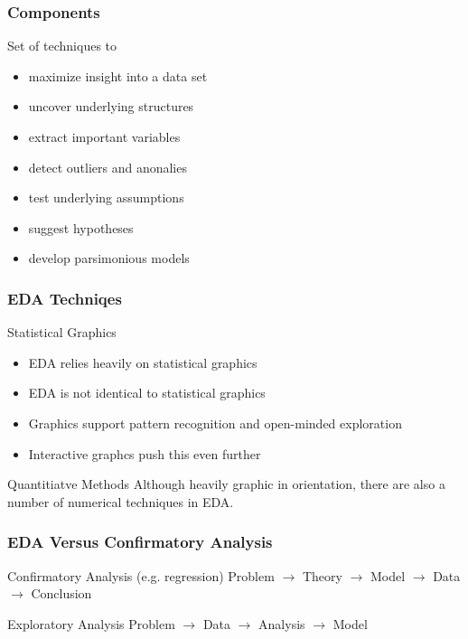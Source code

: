 \documentclass[nototal]{beamer}
\begin{document}
\begin{frame}
	\frametitle{Components}
 
\begin{block}{Set of techniques to}
 \begin{itemize}
 \item  maximize insight into a data set
 \item  uncover underlying structures
 \item  extract important variables
 \item  detect outliers and anonalies
 \item  test underlying assumptions
 \item  suggest hypotheses
 \item  develop parsimonious models
 \end{itemize}
 \end{block} \end{frame} 

\begin{frame}
	\frametitle{EDA Techniqes}
 
\begin{block}{Statistical Graphics}
 \begin{itemize}
 \item  EDA relies heavily on statistical graphics
 \item  EDA is not identical to statistical graphics
 \item  Graphics support pattern recognition and open-minded exploration
 \item  Interactive graphcs push this even further
 \end{itemize}
 \end{block} 
\begin{block}{Quantitiatve Methods}
  Although heavily graphic in orientation, there are also a number
  of numerical techniques in EDA.
 \end{block} \end{frame} 

\begin{frame}
	\frametitle{EDA Versus Confirmatory Analysis}
 
\begin{block}{Confirmatory Analysis (e.g. regression)}
  Problem $\rightarrow$ Theory $\rightarrow$ Model $\rightarrow$ Data $\rightarrow$ Conclusion
 \end{block} 
\begin{block}{Exploratory Analysis}
  Problem $\rightarrow$ Data $\rightarrow$ Analysis $\rightarrow$ Model
 \end{block} \end{frame} 
\end{document}
